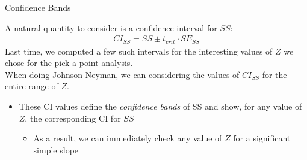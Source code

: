 \documentclass{beamer}
\newcommand{\va}[0]{\vspace{12pt}}
\newcommand{\vb}[0]{\vspace{6pt}}
\newcommand{\vc}[0]{\vspace{3pt}}
\begin{document}
\begin{frame}{Confidence Bands}
  
  A natural quantity to consider is a confidence interval for $SS$:
  \begin{align*}
    CI_{SS} = SS \pm t_{crit} \cdot SE_{SS}
  \end{align*}
  \vc 
  Last time, we computed a few such intervals for the interesting
  values of $Z$ we chose for the pick-a-point analysis.\\ 
  \va 
  When doing Johnson-Neyman, we can considering the values of $CI_{SS}$
  for the entire range of $Z$.  
  \vb
  \begin{itemize}
  \item These CI values define the \emph{confidence bands} of SS and
    show, for any value of $Z$, the corresponding CI for $SS$
    \vb
    \begin{itemize}
    \item As a result, we can immediately check any value of $Z$ for
      a significant simple slope
    \end{itemize}
  \end{itemize}
  
\end{frame}
\end{document}

